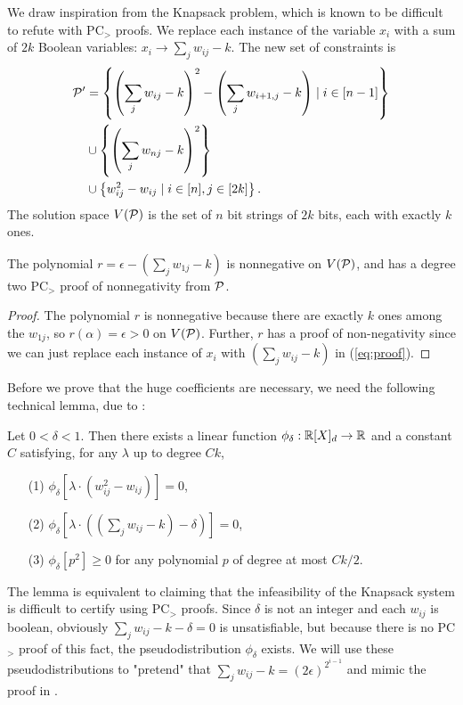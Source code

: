 We draw inspiration from the Knapsack problem, which is known to be difficult to refute with PC$_>$ proofs. We replace each instance of the variable $x_i$ with a sum of $2k$ Boolean variables: $x_i \rightarrow \sum_j w_{ij} - k$. The new set of constraints is
\begin{align*}
\mathcal P' &= \left\{\left(\sum_j w_{ij} - k\right)^2 - \left(\sum_j w_{i+1,j} - k\right) \mid i \in [n-1]\right\} \\
&\cup \left\{\left(\sum_j w_{nj} - k\right)^2 \right\} \\
&\cup \left\{w_{ij}^2 - w_{ij} \mid i \in [n], j \in [2k]\right\}.
\end{align*}
The solution space $V(\mathcal P)$ is the set of $n$ bit strings of $2k$ bits, each with exactly $k$ ones.
\begin{lemma}\label{lem:boolean-degtwoproof}
The polynomial $r = \epsilon - \left(\sum_j w_{1j} - k\right)$ is nonnegative on $V(\mathcal P)$, and has a degree two PC$_>$ proof of nonnegativity from $\mathcal P$.
\end{lemma}
\begin{proof}
The polynomial $r$ is nonnegative because there are exactly $k$ ones among the $w_{1j}$, so $r(\alpha) = \epsilon > 0$ on $V(\mathcal P)$.
Further, $r$ has a proof of non-negativity since we can just replace each instance of $x_i$ with $\left(\sum_j w_{ij} - k\right)$ in (\ref{eq:proof}). 
\end{proof}

Before we prove that the huge coefficients are necessary, we need the following technical lemma, due to \cite{Gri01b}:
\begin{lemma}\label{lem:knapsack-pd}
Let $0 < \delta < 1$. Then there exists a linear function $\phi_\delta: \mathbb R[X]_d \rightarrow \mathbb R$ and a constant $C$ satisfying, for any $\lambda$ up to degree $Ck$,
\begin{enumerate}
\item[(1)] $\phi_\delta[\lambda\cdot(w_{ij}^2 - w_{ij})] = 0$,
\item[(2)] $\phi_\delta[\lambda\cdot((\sum_j w_{ij} - k) - \delta)] = 0$,
\item[(3)] $\phi_\delta[p^2] \geq 0$ for any polynomial $p$ of degree at most $Ck/2$.
\end{enumerate}
\end{lemma}
The lemma is equivalent to claiming that the infeasibility of the Knapsack system is difficult to certify using PC$_>$ proofs. Since $\delta$ is not an integer and each $w_{ij}$ is boolean, obviously $\sum_j w_{ij} - k - \delta = 0$ is unsatisfiable, but because there is no PC$_>$ proof of this fact, the pseudodistribution $\phi_\delta$ exists. We will use these pseudodistributions to "pretend" that $\sum_j w_{ij} - k = (2\epsilon)^{2^{i-1}}$ and mimic the proof in .

